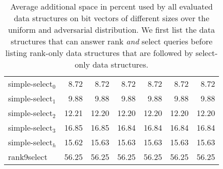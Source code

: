 \documentclass[a4paper,UKenglish,cleveref, autoref, thm-restate]{lipics-v2021}
\begin{document}
\begin{table}
\begin{tabular}{lrrrrrr}
    simple-select\(_0\) &  8.72 &  8.72 &  8.72 &  8.72 &  8.72 &  8.72 \\
    simple-select\(_1\) &  9.88 &  9.88 &  9.88 &  9.88 &  9.88 &  9.88 \\
    simple-select\(_2\) & 12.21 & 12.20 & 12.20 & 12.20 & 12.20 & 12.20 \\
    simple-select\(_3\) & 16.85 & 16.85 & 16.84 & 16.84 & 16.84 & 16.84 \\
    simple-select\(_h\) & 15.62 & 15.63 & 15.63 & 15.63 & 15.63 & 15.63 \\
    rank9select & 56.25 & 56.25 & 56.25 & 56.25 & 56.25 & 56.25 \\
    \bottomrule
  \end{tabular}
  \caption{Average additional space in percent used by all evaluated data structures on bit vectors of different sizes over the uniform and adversarial distribution.
    We first list the data structures that can answer rank \emph{and} select queries before listing rank-only data structures that are followed by select-only data structures.}
  \label{tab:space_requirements}
\end{table}
\end{document}
